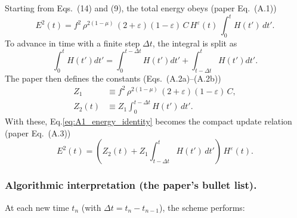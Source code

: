 \documentclass{article}
\begin{document}
Starting from Eqs.~(14) and (9), the total energy obeys (paper Eq.~(A.1))
\begin{equation}
E^2(t)
=
f^2\,\rho^{2(1-\mu)}\,(2+\varepsilon)(1-\varepsilon)\,C\,
H^{\varepsilon}(t)\,
\int_{0}^{t} H(t')\,dt'.
\label{eq:A1_energy_identity}
\end{equation}
To advance in time with a finite step $\Delta t$, the integral is split as
\begin{equation}
\int_{0}^{t} H(t')dt'
=
\int_{0}^{t-\Delta t} H(t')dt'
+
\int_{t-\Delta t}^{t} H(t')dt'.
\end{equation}
The paper then defines the constants (Eqs.~(A.2a)--(A.2b))
\begin{align}
Z_1 &\equiv f^2\,\rho^{2(1-\mu)}\,(2+\varepsilon)(1-\varepsilon)\,C, \label{eq:Z1_def}\\
Z_2(t) &\equiv Z_1 \int_{0}^{t-\Delta t} H(t')\,dt'. \label{eq:Z2_def}
\end{align}
With these, Eq.\eqref{eq:A1_energy_identity} becomes the compact update relation (paper Eq.~(A.3))
\begin{equation}
E^2(t)
=
\left(
Z_2(t) + Z_1\int_{t-\Delta t}^{t} H(t')\,dt'
\right)\,H^{\varepsilon}(t).
\label{eq:A3_compact}
\end{equation}

\subsubsection*{Algorithmic interpretation (the paper's bullet list).}
At each new time $t_n$ (with $\Delta t = t_n-t_{n-1}$), the scheme performs:
\end{document}
